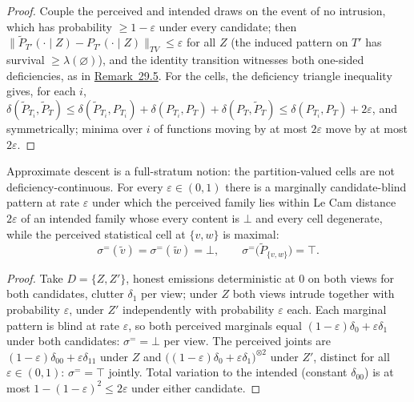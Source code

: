 \begin{proof}

Couple the perceived and intended draws on the event of no intrusion, which has probability \(\ge 1 - \varepsilon\) under every candidate; then \(\|\widetilde{P}_{T'}(\cdot \mid Z) - P_{T'}(\cdot \mid Z)\|_{TV} \le \varepsilon\) for all \(Z\) (the induced pattern on \(T'\) has survival \(\ge \lambda(\varnothing)\)), and the identity transition witnesses both one-sided deficiencies, as in \hyperlink{stmt:29.5}{Remark~29.5}. For the cells, the deficiency triangle inequality gives, for each \(i\), \(\delta(\widetilde{P}_{T_i}, \widetilde{P}_T) \le \delta(\widetilde{P}_{T_i}, P_{T_i}) + \delta(P_{T_i}, P_T) + \delta(P_T, \widetilde{P}_T) \le \delta(P_{T_i}, P_T) + 2\varepsilon\), and symmetrically; minima over \(i\) of functions moving by at most \(2\varepsilon\) move by at most \(2\varepsilon\).
\end{proof}

\begin{thmplain}

Approximate descent is a full-stratum notion: the partition-valued cells are not deficiency-continuous. For every \(\varepsilon \in (0, 1)\) there is a marginally candidate-blind pattern at rate \(\varepsilon\) under which the perceived family lies within Le Cam distance \(2\varepsilon\) of an intended family whose every content is \(\bot\) and every cell degenerate, while the perceived statistical cell at \(\{v, w\}\) is maximal:
\[
\sigma^{=}(\widetilde{v}) = \sigma^{=}(\widetilde{w}) = \bot,
\qquad
\sigma^{=}\big(\widetilde{P}_{\{v,w\}}\big) = \top .
\]
\end{thmplain}

\begin{proof}

Take \(D = \{Z, Z'\}\), honest emissions deterministic at \(0\) on both views for both candidates, clutter \(\delta_1\) per view; under \(Z\) both views intrude together with probability \(\varepsilon\), under \(Z'\) independently with probability \(\varepsilon\) each. Each marginal pattern is blind at rate \(\varepsilon\), so both perceived marginals equal \((1-\varepsilon)\delta_0 + \varepsilon\delta_1\) under both candidates: \(\sigma^= = \bot\) per view. The perceived joints are \((1-\varepsilon)\delta_{00} + \varepsilon\delta_{11}\) under \(Z\) and \(\big((1-\varepsilon)\delta_0 + \varepsilon\delta_1\big)^{\otimes 2}\) under \(Z'\), distinct for all \(\varepsilon \in (0,1)\): \(\sigma^= = \top\) jointly. Total variation to the intended (constant \(\delta_{00}\)) is at most \(1 - (1-\varepsilon)^2 \le 2\varepsilon\) under either candidate.
\end{proof}


